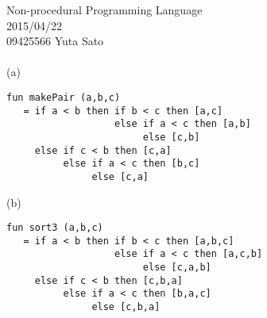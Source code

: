 
\oddsidemargin  -5mm
\evensidemargin -5mm
\textwidth      170mm
\textheight     250mm
\topmargin      -20mm



Non-procedural Programming Language
\\
2015/04/22
\\
09425566
Yuta Sato 
\\
\\
(a)
\begin{verbatim}
fun makePair (a,b,c)
   = if a < b then if b < c then [a,c]
                   else if a < c then [a,b]
                        else [c,b]
     else if c < b then [c,a]
          else if a < c then [b,c]
               else [c,a]
\end{verbatim}


(b)

\begin{verbatim}
fun sort3 (a,b,c)
   = if a < b then if b < c then [a,b,c]
                   else if a < c then [a,c,b]
                        else [c,a,b]
     else if c < b then [c,b,a]
          else if a < c then [b,a,c]
               else [c,b,a]
\end{verbatim}




